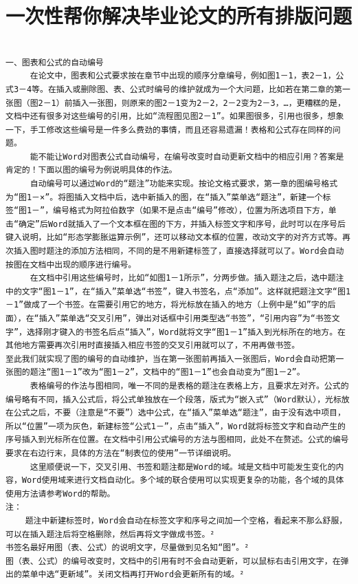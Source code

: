 \section{一次性帮你解决毕业论文的所有排版问题}
\begin{verbatim}

一、图表和公式的自动编号 
     在论文中，图表和公式要求按在章节中出现的顺序分章编号，例如图1－1，表2－1，公式3－4等。在插入或删除图、表、公式时编号的维护就成为一个大问题，比如若在第二章的第一张图（图2－1）前插入一张图，则原来的图2－1变为2－2，2－2变为2－3，…，更糟糕的是，文档中还有很多对这些编号的引用，比如“流程图见图2－1”。如果图很多，引用也很多，想象一下，手工修改这些编号是一件多么费劲的事情，而且还容易遗漏！表格和公式存在同样的问题。 
     能不能让Word对图表公式自动编号，在编号改变时自动更新文档中的相应引用？答案是肯定的！下面以图的编号为例说明具体的作法。 
     自动编号可以通过Word的“题注”功能来实现。按论文格式要求，第一章的图编号格式为“图1－×”。将图插入文档中后，选中新插入的图，在“插入”菜单选“题注”，新建一个标签“图1－”，编号格式为阿拉伯数字（如果不是点击“编号”修改），位置为所选项目下方，单击“确定”后Word就插入了一个文本框在图的下方，并插入标签文字和序号，此时可以在序号后键入说明，比如“形态学膨胀运算示例”，还可以移动文本框的位置，改动文字的对齐方式等。再次插入图时题注的添加方法相同，不同的是不用新建标签了，直接选择就可以了。Word会自动按图在文档中出现的顺序进行编号。 
     在文档中引用这些编号时，比如“如图1－1所示”，分两步做。插入题注之后，选中题注中的文字“图1－1”，在“插入”菜单选“书签”，键入书签名，点“添加”。这样就把题注文字“图1－1”做成了一个书签。在需要引用它的地方，将光标放在插入的地方（上例中是“如”字的后面），在“插入”菜单选“交叉引用”，弹出对话框中引用类型选“书签”，“引用内容”为“书签文字”，选择刚才键入的书签名后点“插入”，Word就将文字“图1－1”插入到光标所在的地方。在其他地方需要再次引用时直接插入相应书签的交叉引用就可以了，不用再做书签。 
至此我们就实现了图的编号的自动维护，当在第一张图前再插入一张图后，Word会自动把第一张图的题注“图1－1”改为“图1－2”，文档中的“图1－1”也会自动变为“图1－2”。 
     表格编号的作法与图相同，唯一不同的是表格的题注在表格上方，且要求左对齐。公式的编号略有不同，插入公式后，将公式单独放在一个段落，版式为“嵌入式”（Word默认），光标放在公式之后，不要（注意是“不要”）选中公式，在“插入”菜单选“题注”，由于没有选中项目，所以“位置”一项为灰色，新建标签“公式1－”，点击“插入”，Word就将标签文字和自动产生的序号插入到光标所在位置。在文档中引用公式编号的方法与图相同，此处不在赘述。公式的编号要求在右边行末，具体的方法在“制表位的使用”一节详细说明。 
     这里顺便说一下，交叉引用、书签和题注都是Word的域。域是文档中可能发生变化的内容，Word使用域来进行文档自动化。多个域的联合使用可以实现更复杂的功能，各个域的具体使用方法请参考Word的帮助。 
注： 
    题注中新建标签时，Word会自动在标签文字和序号之间加一个空格，看起来不那么舒服，可以在插入题注后将空格删除，然后再将文字做成书签。² 
书签名最好用图（表、公式）的说明文字，尽量做到见名知“图”。² 
图（表、公式）的编号改变时，文档中的引用有时不会自动更新，可以鼠标右击引用文字，在弹出的菜单中选“更新域”。关闭文档再打开Word会更新所有的域。²
 

\end{verbatim}
